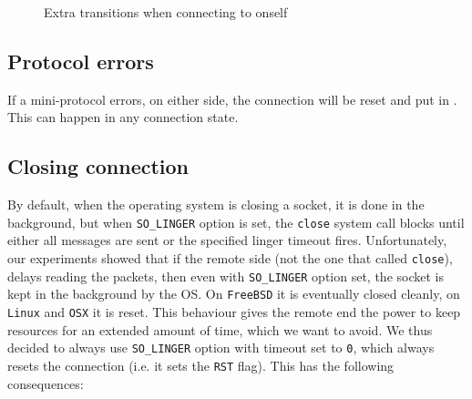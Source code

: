 \begin{figure}[p]
{}
  \caption{Extra transitions when connecting to onself}
  \label{fig:statediagram-selfconn}
\end{figure}

\subsection{Protocol errors}
If a mini-protocol errors, on either side, the connection will be reset and put in
\TerminatedState{}. This can happen in any connection state.


\subsection{Closing connection}\label{sec:connection-close}

By default, when the operating system is closing a socket, it is done in the
background, but when \texttt{SO\_LINGER} option is set, the \texttt{close}
system call blocks until either all messages are sent or the specified linger
timeout fires. Unfortunately, our experiments showed that if the remote side
(not the one that called \texttt{close}), delays reading the packets, then even
with \texttt{SO\_LINGER} option set, the socket is kept in the background by
the OS.  On \texttt{FreeBSD} it is eventually closed cleanly, on \texttt{Linux}
and \texttt{OSX} it is reset. This behaviour gives the remote end the power to keep resources for an extended amount of time, which we want to
avoid. We thus decided to always use \texttt{SO\_LINGER} option with timeout
set to \texttt{0}, which always resets the connection (i.e. it sets the
\texttt{RST} \TCP{} flag). This has the following consequences:

